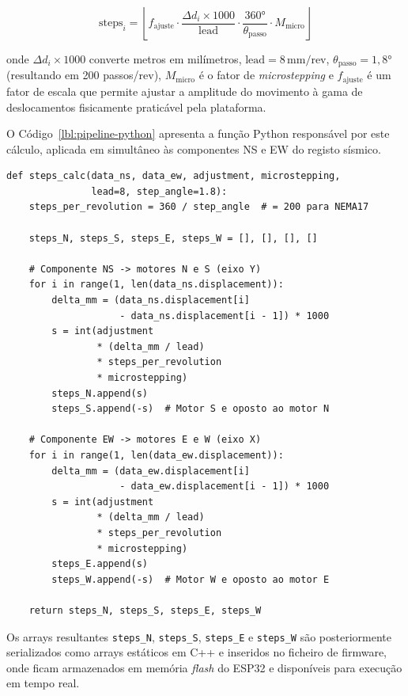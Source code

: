 \begin{equation}
\text{steps}_i = \left\lfloor f_{\text{ajuste}} \cdot \frac{\Delta d_i \times 1000}{\text{lead}} \cdot \frac{360°}{\theta_{\text{passo}}} \cdot M_{\text{micro}} \right\rfloor
\label{eq:steps}
\end{equation}

onde $\Delta d_i \times 1000$ converte metros em milímetros, $\text{lead} = 8\,\text{mm/rev}$, $\theta_{\text{passo}} = 1{,}8°$ (resultando em 200 passos/rev), $M_{\text{micro}}$ é o fator de \textit{microstepping} e $f_{\text{ajuste}}$ é um fator de escala que permite ajustar a amplitude do movimento à gama de deslocamentos fisicamente praticável pela plataforma.

O Código~\ref{lbl:pipeline-python} apresenta a função Python responsável por este cálculo, aplicada em simultâneo às componentes NS e EW do registo sísmico.

\begin{listing}[h]
\begin{verbatim}
def steps_calc(data_ns, data_ew, adjustment, microstepping,
               lead=8, step_angle=1.8):
    steps_per_revolution = 360 / step_angle  # = 200 para NEMA17

    steps_N, steps_S, steps_E, steps_W = [], [], [], []

    # Componente NS -> motores N e S (eixo Y)
    for i in range(1, len(data_ns.displacement)):
        delta_mm = (data_ns.displacement[i]
                    - data_ns.displacement[i - 1]) * 1000
        s = int(adjustment
                * (delta_mm / lead)
                * steps_per_revolution
                * microstepping)
        steps_N.append(s)
        steps_S.append(-s)  # Motor S e oposto ao motor N

    # Componente EW -> motores E e W (eixo X)
    for i in range(1, len(data_ew.displacement)):
        delta_mm = (data_ew.displacement[i]
                    - data_ew.displacement[i - 1]) * 1000
        s = int(adjustment
                * (delta_mm / lead)
                * steps_per_revolution
                * microstepping)
        steps_E.append(s)
        steps_W.append(-s)  # Motor W e oposto ao motor E

    return steps_N, steps_S, steps_E, steps_W
\end{verbatim}
\caption{Função Python de conversão de deslocamento sísmico em passos de motor.}
\label{lbl:pipeline-python}
\end{listing}

Os arrays resultantes \texttt{steps\_N}, \texttt{steps\_S}, \texttt{steps\_E} e \texttt{steps\_W} são posteriormente serializados como arrays estáticos em C++ e inseridos no ficheiro de firmware, onde ficam armazenados em memória \textit{flash} do ESP32 e disponíveis para execução em tempo real.


